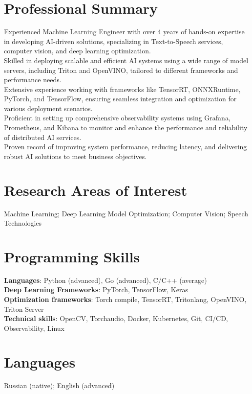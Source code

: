 \section{\sc Professional Summary}
Experienced Machine Learning Engineer with over 4 years of hands-on expertise in developing AI-driven solutions, specializing in Text-to-Speech services, computer vision, and deep learning optimization. \\
Skilled in deploying scalable and efficient AI systems using a wide range of model servers, including Triton and OpenVINO, tailored to different frameworks and performance needs. \\
Extensive experience working with frameworks like TensorRT, ONNXRuntime, PyTorch, and TensorFlow, ensuring seamless integration and optimization for various deployment scenarios. \\
Proficient in setting up comprehensive observability systems using Grafana, Prometheus, and Kibana to monitor and enhance the performance and reliability of distributed AI services. \\
Proven record of improving system performance, reducing latency, and delivering robust AI solutions to meet business objectives.

\section{\sc Research Areas of Interest}
{Machine Learning; Deep Learning Model Optimization; Computer Vision; Speech Technologies}

\section{\sc Programming Skills}
\textbf{Languages}: Python (advanced), Go (advanced), C/C++ (average) \\
\textbf{Deep Learning Frameworks}: PyTorch, TensorFlow, Keras \\
\textbf{Optimization frameworks}: Torch compile, TensorRT, Tritonlang, OpenVINO, Triton Server \\
\textbf{Technical skills}: OpenCV, Torchaudio, Docker, Kubernetes, Git, CI/CD, Observability, Linux

\section{\sc Languages}
{Russian (native); English (advanced)}

\endinput
